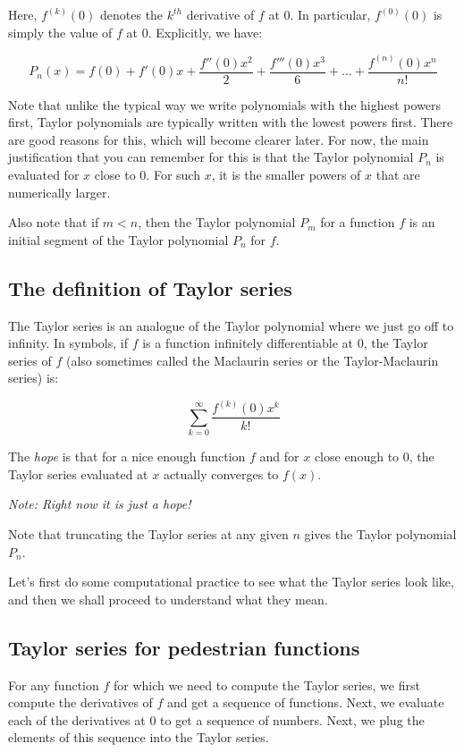 \documentclass{amsart}
\begin{document}
Here, $f^{(k)}(0)$ denotes the $k^{th}$ derivative of $f$ at $0$. In
particular, $f^{(0)}(0)$ is simply the value of $f$ at
$0$. Explicitly, we have:

$$P_n(x) = f(0) + f'(0)x + \frac{f''(0)x^2}{2} + \frac{f'''(0)x^3}{6} + \dots + \frac{f^{(n)}(0)x^n}{n!}$$

Note that unlike the typical way we write polynomials with the highest
powers first, Taylor polynomials are typically written with the lowest
powers first. There are good reasons for this, which will become
clearer later. For now, the main justification that you can remember
for this is that the Taylor polynomial $P_n$ is evaluated for $x$
close to $0$. For such $x$, it is the smaller powers of $x$ that are
numerically larger. 

Also note that if $m < n$, then the Taylor polynomial $P_m$ for a
function $f$ is an initial segment of the Taylor polynomial $P_n$ for
$f$.

\subsection{The definition of Taylor series}

The Taylor series is an analogue of the Taylor polynomial where we
just go off to infinity. In symbols, if $f$ is a function infinitely
differentiable at $0$, the Taylor series of $f$ (also sometimes called
the Maclaurin series or the Taylor-Maclaurin series) is:

$$\sum_{k=0}^\infty \frac{f^{(k)}(0)x^k}{k!}$$

The {\em hope} is that for a nice enough function $f$ and for $x$ close
enough to $0$, the Taylor series evaluated at $x$ actually converges
to $f(x)$.

{\em Note: Right now it is just a hope!}

Note that truncating the Taylor series at any given $n$ gives the
Taylor polynomial $P_n$.

Let's first do some computational practice to see what the Taylor
series look like, and then we shall proceed to understand what they
mean.

\subsection{Taylor series for pedestrian functions}

For any function $f$ for which we need to compute the Taylor series,
we first compute the derivatives of $f$ and get a sequence of
functions. Next, we evaluate each of the derivatives at $0$ to get a
sequence of numbers. Next, we plug the elements of this sequence into
the Taylor series.
\end{document}
